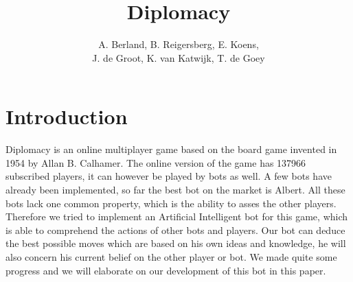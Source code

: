 \documentclass[a4paper]{article} %
\title{Diplomacy}
\author{A. Berland, B. Reigersberg, E. Koens, \\J. de Groot, K. van Katwijk, T. de Goey}
\begin{document}
\maketitle
\tableofcontents
\newpage

\section{Introduction}
Diplomacy is an online multiplayer game based on the board game invented in 1954 by Allan B. Calhamer. The online version of the game has 137966 subscribed players, it can however be played by bots as well. A few bots have already been implemented, so far the best bot on the market is Albert. All these bots lack one common property, which is the ability to asses the other players. Therefore we tried to implement an Artificial Intelligent bot for this game, which is able to comprehend the actions of other bots and players. Our bot can deduce the best possible moves which are based on his own ideas and knowledge, he will also concern his current belief on the other player or bot. We made quite some progress and we will elaborate on our development of this bot in this paper.
\end{document}
